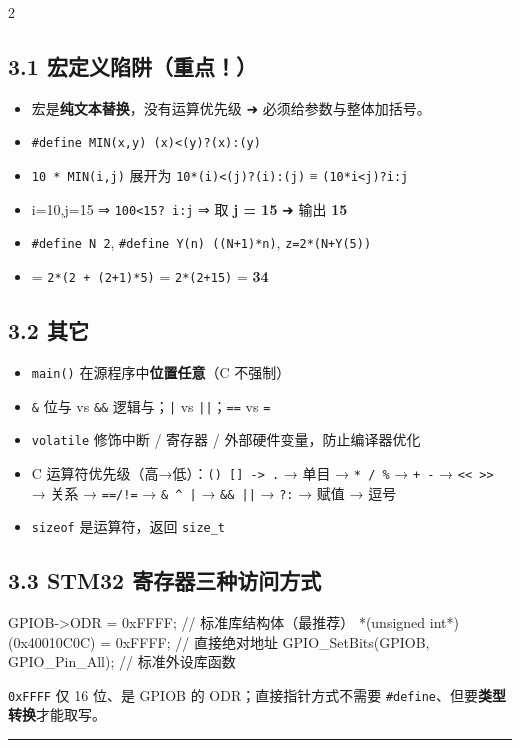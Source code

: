 \documentclass[UTF8,zihao=-5]{ctexart}
\newcommand{\hint}[1]{{\color{gray!35!black}\footnotesize #1}}
\begin{document}
\begin{multicols*}{2}
\subsection*{3.1 宏定义陷阱（重点！）}
\begin{itemize}
\item 宏是\textbf{纯文本替换}，没有运算优先级 ➜ 必须给参数与整体加括号。
\item \texttt{\#define MIN(x,y) (x)\textless{}(y)?(x):(y)}
\item \texttt{10 * MIN(i,j)} 展开为 \texttt{10*(i)\textless{}(j)?(i):(j)} ≡ \texttt{(10*i\textless{}j)?i:j}
\item i=10,j=15 ⇒ \texttt{100\textless{}15? i:j} ⇒ 取 \textbf{j = 15} ➜ 输出 \textbf{15}
\item \texttt{\#define N 2}, \texttt{\#define Y(n) ((N+1)*n)}, \texttt{z=2*(N+Y(5))}
\item = \texttt{2*(2 + (2+1)*5)} = \texttt{2*(2+15)} = \textbf{34}
\end{itemize}
\subsection*{3.2 其它}
\begin{itemize}
\item \texttt{main()} 在源程序中\textbf{位置任意}（C 不强制）
\item \texttt{\&} 位与 vs \texttt{\&\&} 逻辑与；\texttt{|} vs \texttt{||}；\texttt{==} vs \texttt{=}
\item \texttt{volatile} 修饰中断 / 寄存器 / 外部硬件变量，防止编译器优化
\item C 运算符优先级（高→低）：\texttt{() [] -\textgreater{} .} → 单目 → \texttt{* / \%} → \texttt{+ -} → \texttt{\textless{}\textless{} \textgreater{}\textgreater{}} → 关系 → \texttt{==/!=} → \texttt{\& \textasciicircum{} |} → \texttt{\&\& ||} → \texttt{?:} → 赋值 → 逗号
\item \texttt{sizeof} 是运算符，返回 \texttt{size\_t}
\end{itemize}
\subsection*{3.3 STM32 寄存器三种访问方式}
\begin{Code}
GPIOB->ODR = 0xFFFF;                            // 标准库结构体（最推荐）
*(unsigned int*)(0x40010C0C) = 0xFFFF;          // 直接绝对地址
GPIO_SetBits(GPIOB, GPIO_Pin_All);              // 标准外设库函数
\end{Code}
\hint{\texttt{0xFFFF} 仅 16 位、是 GPIOB 的 ODR；直接指针方式不需要 \texttt{\#define}、但要\textbf{类型转换}才能取写。}\par
\vspace{1pt}\hrule\vspace{1pt}

\end{multicols*}
\end{document}
